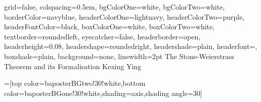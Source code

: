 \documentclass[landscape,final,a0paper]{baposter}
\begin{document}
\newlength{\leftimgwidth}
\begin{poster}%
  {
  grid=false,
  colspacing=0.5em,
  bgColorOne=white,
  bgColorTwo=white,
  borderColor=navyblue,
  headerColorOne=lightnavy,
  headerColorTwo=purple,
  headerFontColor=black,
 boxColorOne=white,
 boxColorTwo=white,
  textborder=roundedleft,
  eyecatcher=false,
  headerborder=open,
  headerheight=0.08\textheight,
  headershape=roundedright,
  headershade=plain,
  headerfont=\Large\textsf, %
  boxshade=plain,
  background=none,
  linewidth=2pt
  }
  {} %
  {\sf %
  \vspace*{5mm}
  \hspace*{2mm} The Stone-Weierstrass Theorem and its Formalisation}
  {\linebreak
  \hspace*{4mm} Kexing Ying
  }
  { %
  }

  =[top color=baposterBGtwo!30!white,bottom color=baposterBGone!30!white,shading=axis,shading angle=30]

     \setlength{\leftimgwidth}{0.78em+8.0em}

\newcommand{\colouredcircle}[1]{%
      \tikz{\useasboundingbox (-0.2em,-0.32em) rectangle(0.2em,0.32em); \draw[draw=black,fill=baposterBGone!80!black!#1!white,line width=0.03em] (0,0) circle(0.18em);}}


\end{poster}
\end{document}
